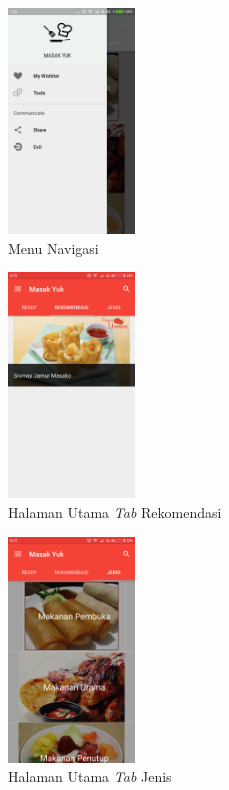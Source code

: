 		\begin{figure}[H]
			\centering
			\includegraphics[width=0.3\textwidth]{gambar/mock-up/navigasi}
			\caption{Menu Navigasi}
		\end{figure}			
		\begin{figure}[H]
			\centering
			\includegraphics[width=0.3\textwidth]{gambar/mock-up/rekomendasi}
			\caption{Halaman Utama \textit{Tab} Rekomendasi}
		\end{figure}			
		\begin{figure}[H]
			\centering
			\includegraphics[width=0.3\textwidth]{gambar/mock-up/jenis}
			\caption{Halaman Utama \textit{Tab} Jenis}
		\end{figure}	
